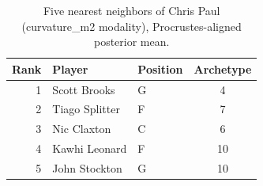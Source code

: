 \begin{table}[htbp]
  \centering\small
  \begin{tabular}{rllc}
    \toprule
    Rank & Player & Position & Archetype \\
    \midrule
    1 & Scott Brooks & G & 4 \\
    2 & Tiago Splitter & F & 7 \\
    3 & Nic Claxton & C & 6 \\
    4 & Kawhi Leonard & F & 10 \\
    5 & John Stockton & G & 10 \\
    \bottomrule
  \end{tabular}
  \caption{Five nearest neighbors of Chris Paul (curvature_m2 modality), Procrustes-aligned posterior mean.}
  \label{tab:Chris_Paul_neighbors_curvature_m2}
\end{table}

